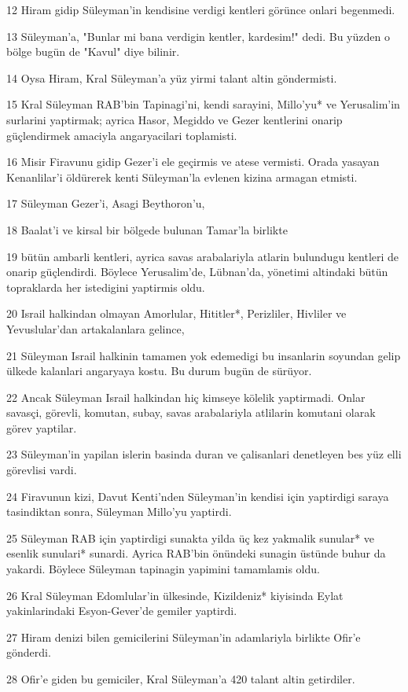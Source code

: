 \par 12 Hiram gidip Süleyman'in kendisine verdigi kentleri görünce onlari begenmedi.
\par 13 Süleyman'a, "Bunlar mi bana verdigin kentler, kardesim!" dedi. Bu yüzden o bölge bugün de "Kavul" diye bilinir.
\par 14 Oysa Hiram, Kral Süleyman'a yüz yirmi talant altin göndermisti.
\par 15 Kral Süleyman RAB'bin Tapinagi'ni, kendi sarayini, Millo'yu* ve Yerusalim'in surlarini yaptirmak; ayrica Hasor, Megiddo ve Gezer kentlerini onarip güçlendirmek amaciyla angaryacilari toplamisti.
\par 16 Misir Firavunu gidip Gezer'i ele geçirmis ve atese vermisti. Orada yasayan Kenanlilar'i öldürerek kenti Süleyman'la evlenen kizina armagan etmisti.
\par 17 Süleyman Gezer'i, Asagi Beythoron'u,
\par 18 Baalat'i ve kirsal bir bölgede bulunan Tamar'la birlikte
\par 19 bütün ambarli kentleri, ayrica savas arabalariyla atlarin bulundugu kentleri de onarip güçlendirdi. Böylece Yerusalim'de, Lübnan'da, yönetimi altindaki bütün topraklarda her istedigini yaptirmis oldu.
\par 20 Israil halkindan olmayan Amorlular, Hititler*, Perizliler, Hivliler ve Yevuslular'dan artakalanlara gelince,
\par 21 Süleyman Israil halkinin tamamen yok edemedigi bu insanlarin soyundan gelip ülkede kalanlari angaryaya kostu. Bu durum bugün de sürüyor.
\par 22 Ancak Süleyman Israil halkindan hiç kimseye kölelik yaptirmadi. Onlar savasçi, görevli, komutan, subay, savas arabalariyla atlilarin komutani olarak görev yaptilar.
\par 23 Süleyman'in yapilan islerin basinda duran ve çalisanlari denetleyen bes yüz elli görevlisi vardi.
\par 24 Firavunun kizi, Davut Kenti'nden Süleyman'in kendisi için yaptirdigi saraya tasindiktan sonra, Süleyman Millo'yu yaptirdi.
\par 25 Süleyman RAB için yaptirdigi sunakta yilda üç kez yakmalik sunular* ve esenlik sunulari* sunardi. Ayrica RAB'bin önündeki sunagin üstünde buhur da yakardi. Böylece Süleyman tapinagin yapimini tamamlamis oldu.
\par 26 Kral Süleyman Edomlular'in ülkesinde, Kizildeniz* kiyisinda Eylat yakinlarindaki Esyon-Gever'de gemiler yaptirdi.
\par 27 Hiram denizi bilen gemicilerini Süleyman'in adamlariyla birlikte Ofir'e gönderdi.
\par 28 Ofir'e giden bu gemiciler, Kral Süleyman'a 420 talant altin getirdiler.

